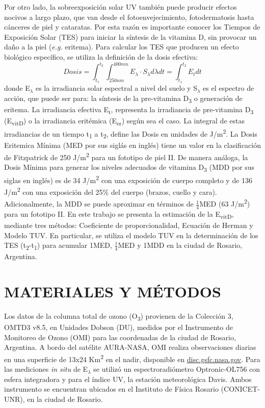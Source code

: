 \documentclass[10pt,twocolumn]{article}
\begin{document}
Por otro lado, la sobreexposición solar UV también puede producir efectos nocivos a largo plazo, que van desde el fotoenvejecimiento, fotodermatosis hasta cánceres de piel y cataratas.\cite{Gilaberte2011,Modenese2016} Por esta razón es importante conocer los Tiempos de Exposición Solar (TES) para iniciar la síntesis de la vitamina D, sin provocar un daño a la piel (\emph{e.g.} eritema). Para calcular los TES que producen un efecto biológico específico, se utiliza la definición de la dosis efectiva:
\begin{equation}
  Dosis=\int_{t_1}^{t_2} \int_{250nm}^{400nm} E_\lambda\cdot S_\lambda d\lambda dt = \int_{t_1}^{t_2}E_tdt \label{eq:dosis}
\end{equation}
donde E$_\lambda$ es la irradiancia solar espectral a nivel del suelo y S$_\lambda$ es el espectro de acción, que puede ser para: la síntesis de la pre-vitamina D\textsubscript{3} o generación de eritema. La irradiancia efectiva E\textsubscript{t}, representa la irradiancia de pre-vitamina D\textsubscript{3} (E\textsubscript{vitD}) o la irradiancia eritémica (E\textsubscript{er}) según sea el caso. La integral de estas irradiancias de un tiempo t\textsubscript{1} a t\textsubscript{2}, define las Dosis en unidades de J/m\textsuperscript{2}.
La Dosis Eritemica Mínima (MED por sus siglás en inglés) tiene un valor en la clasificación de Fitzpatrick de 250 J/m\textsuperscript{2} para un fototipo de piel II.\cite{Fitzpatrick1988} De manera análoga, la Dosis Mínima para generar los niveles adecuados de vitamina D\textsubscript{3} (MDD por sus siglas en inglés) es de 34 J/m\textsuperscript{2} con una exposición de cuerpo completo y de 136 J/m\textsuperscript{2} con una exposición del 25\% del cuerpo (brazos, cuello y cara).\cite{UVDoses, Fioletov_2010} Adicionalmente, la MDD se puede aproximar en términos de $\frac{1}{4}$MED (63 J/m\textsuperscript{2}) para un fototipo II\cite{Dowdy_2010}. En este trabajo se presenta la estimación de la E\textsubscript{vitD}, mediante tres métodos: Coeficiente de proporcionalidad,\cite{UVDoses} Ecuación de Herman\cite{Herman2010} y Modelo TUV.\cite{Madronich1987} En particular, se utiliza el modelo TUV en la determinación de los TES (t\textsubscript{2}-t\textsubscript{1}) para acumular 1MED, $\frac{1}{4}$MED y 1MDD en la ciudad de Rosario, Argentina.

\section{MATERIALES Y MÉTODOS}
Los datos de la columna total de ozono (O\textsubscript{3}) provienen de la Colección 3, OMTD3 v8.5, en Unidades Dobson (DU), medidos por el Instrumento de Monitoreo de Ozono (OMI) para las coordenadas de la ciudad de Rosario, Argentina. A bordo del satélite AURA-NASA, OMI realiza observaciones diarias en una superficie de 13x24 Km\textsuperscript{2} en el nadir, disponible en \href{(disc.gsfc.nasa.gov)}{\url{disc.gsfc.nasa.gov}}. Para las mediciones \emph{in situ} de E$_\lambda$ se utilizó un espectroradiómetro Optronic-OL756 con esfera integradora y para el índice UV, la estación meteorológica Davis. Ambos instrumento se encuentran ubicados en el Instituto de Física Rosario (CONICET-UNR), en la ciudad de Rosario.
\end{document}
